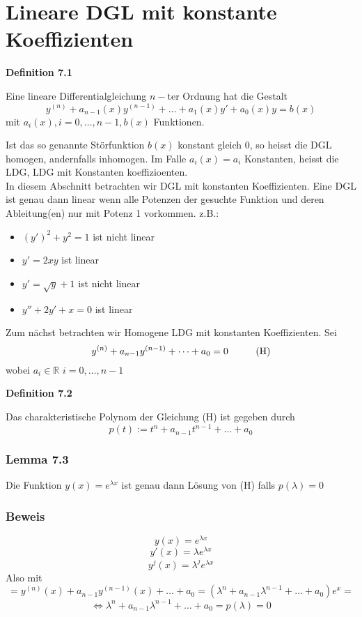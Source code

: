\section{Lineare DGL mit konstante Koeffizienten} 
\begin{framed}
\centerline{\textbf{Definition 7.1}}
\noindent Eine lineare Differentialgleichung $n-$ter Ordnung hat die Gestalt \[{y^{(n)}} + {a_{n - 1}}(x){y^{(n - 1)}} +  \ldots  + {a_1}(x)y' + {a_0}(x)y = b(x)\] mit $a_i(x),i=0,\dots,n-1, b(x)$ Funktionen. 
\end{framed} 
Ist das so genannte Störfunktion $b(x)$ konstant gleich 0, so heisst die DGL homogen, andernfalls inhomogen. Im Falle $a_i(x)=a_i$ Konstanten, heisst die LDG, LDG mit Konstanten koeffizioenten. \\

In diesem Abschnitt betrachten wir DGL mit konstanten Koeffizienten. Eine DGL ist genau dann linear wenn alle Potenzen der gesuchte Funktion und deren Ableitung(en) nur mit Potenz 1 vorkommen.
z.B.:
\begin{itemize}
\item $\left( y'\right)^2+y^2=1$ ist nicht linear
\item $y'=2xy$ ist linear
\item $y'=\sqrt{y}+1$ ist nicht linear
\item $y''+2y'+x=0$ ist linear
\end{itemize}

\noindent Zum nächst betrachten wir Homogene LDG mit konstanten Koeffizienten. Sei $$y^{(n)}+a_{n-1}y^{(n-1)}+\dots+a_0=0\text{\hspace{10mm}(H)}$$ wobei $a_i\in\mathbb{R}$ $i=0,\dots,n-1$
\begin{framed}
\centerline{\textbf{Definition 7.2}}
\noindent Das charakteristische Polynom der Gleichung (H) ist gegeben durch $$p(t):=t^n+a_{n-1}t^{n-1}+\dots+a_0$$
\end{framed} 
\subsubsection*{Lemma 7.3}
Die Funktion $y(x)=e^{\lambda x}$ ist genau dann Lösung von (H) falls $p(\lambda)=0$ 
\subsubsection*{Beweis}
$$y(x)=e^{\lambda x}$$
$$y'(x)=\lambda e^{\lambda x}$$
$$y^j(x)=\lambda ^je^{\lambda x}$$
Also mit $$=y^{(n)}(x)+a_{n-1}y^{(n-1)}(x)+\dots+a_0=(\lambda ^n+a_{n-1}\lambda ^{n-1}+\dots +a_0)e^x=$$
$$\Leftrightarrow \lambda^n+a_{n-1}\lambda^{n-1}+\dots +a_0=p(\lambda)=0$$

